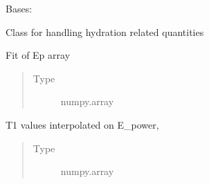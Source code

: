 \documentclass[letterpaper,10pt,english]{sphinxmanual}
\begin{document}
\begin{fulllineitems}
\label{\detokenize{dnpHydration:dnpLab.dnpHydration.HydrationResults}}
Bases: {\hyperref[\detokenize{dnpHydration:dnpLab.dnpHydration.AttrDict}]{}}

Class for handling hydration related quantities

\begin{fulllineitems}
\label{\detokenize{dnpHydration:dnpLab.dnpHydration.HydrationResults.uncorrected_Ep}}
Fit of Ep array
\begin{quote}\begin{description}
\item[{Type}] \leavevmode
numpy.array

\end{description}\end{quote}

\end{fulllineitems}


\begin{fulllineitems}
\label{\detokenize{dnpHydration:dnpLab.dnpHydration.HydrationResults.interpolated_T1}}
T1 values interpolated on E\_power,
\begin{quote}\begin{description}
\item[{Type}] \leavevmode
numpy.array

\end{description}\end{quote}

\end{fulllineitems}



\end{fulllineitems}
\end{document}
